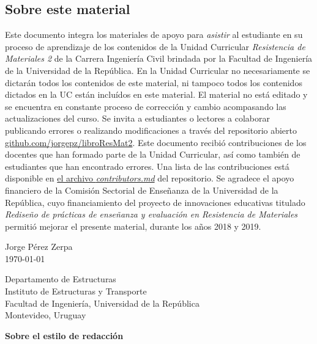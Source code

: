 \subsection*{Sobre este material}

\thispagestyle{empty}

Este documento integra los materiales de apoyo para \textit{asistir} al estudiante en su proceso de aprendizaje de los contenidos de la Unidad Curricular \textit{Resistencia de Materiales 2} de la Carrera Ingeniería Civil brindada por la Facultad de Ingeniería de la Universidad de la República. %
%
En la Unidad Curricular no necesariamente se dictarán todos los contenidos de este material, ni tampoco todos los contenidos dictados en la UC están incluídos en este material. %
%
El material no está editado y se encuentra en constante proceso de corrección y cambio acompasando las actualizaciones del curso. Se invita a estudiantes o lectores a colaborar publicando errores o realizando modificaciones a través del repositorio abierto \href{https://github.com/jorgepz/libroResMat2}{github.com/jorgepz/libroResMat2}. %
%
Este documento recibió contribuciones de los docentes que han formado parte de la Unidad Curricular, así como también de estudiantes que han encontrado errores. %
Una lista de las contribuciones está disponible en \href{https://github.com/jorgepz/libroResMat2/blob/master/contributors.md}{el archivo \textit{contributors.md}} del repositorio. %
%
Se agradece el apoyo financiero de la Comisión Sectorial de Enseñanza de la Universidad de la República, cuyo financiamiento del proyecto de innovaciones educativas titulado \textit{Rediseño de prácticas de enseñanza y evaluación en Resistencia de Materiales} permitió mejorar el presente material, durante los años 2018 y 2019. %
%
\begin{flushright}
Jorge Pérez Zerpa\\
\today
\end{flushright} 

\begin{flushleft}
Departamento de Estructuras\\
Instituto de Estructuras y Transporte\\
Facultad de Ingeniería, Universidad de la República\\
Montevideo, Uruguay
\end{flushleft} 


\vspace{3mm}


\noindent
\textbf{Sobre el estilo de redacción}

